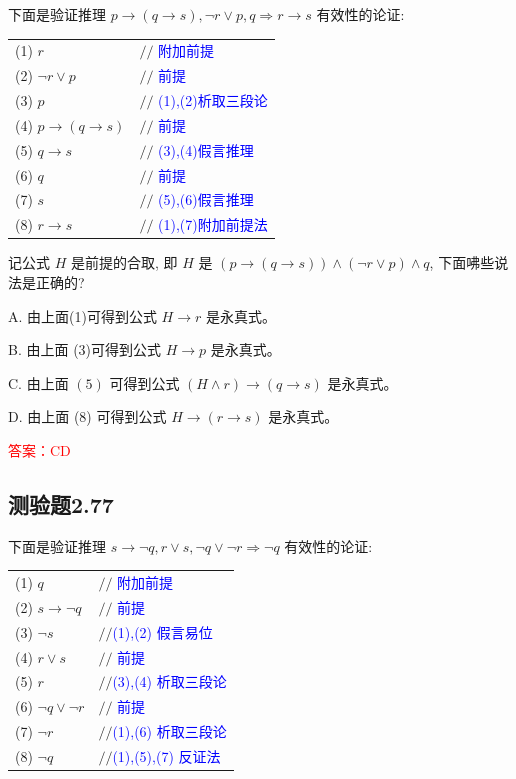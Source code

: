 \documentclass[UTF8, heading=true]{ctexart}
\begin{document}
下面是验证推理 $p \rightarrow(q \rightarrow s), \neg r \vee p, q \Longrightarrow r \rightarrow s$ 有效性的论证:

\begin{table}[H]
  \centering
  \renewcommand{\arraystretch}{1.8}
\begin{tabular}{ll} 
(1) $r$ & $/ /$ \textcolor{blue}{附加前提} \\
(2) $\neg r \vee p$ & $/ /$ \textcolor{blue}{前提} \\
(3) $p$ & $/ /$ \textcolor{blue}{(1),(2)析取三段论} \\
(4) $p \rightarrow(q \rightarrow s)$ & $/ /$ \textcolor{blue}{前提} \\
(5) $q \rightarrow s$ & $/ /$ \textcolor{blue}{(3),(4)假言推理} \\
(6) $q$ & $/ /$ \textcolor{blue}{前提} \\
(7) $s$ & $/ /$ \textcolor{blue}{(5),(6)假言推理} \\
(8) $r \rightarrow s$ & $/ /$ \textcolor{blue}{(1),(7)附加前提法}
\end{tabular}
\end{table}

记公式 $H$ 是前提的合取, 即 $H$ 是 $(p \rightarrow(q \rightarrow s)) \wedge(\neg r \vee p) \wedge q$, 下面咈些说法是正确的?

A. 由上面(1)可得到公式 $H \rightarrow r$ 是永真式。

B. 由上面 (3)可得到公式 $H \rightarrow p$ 是永真式。

C. 由上面 $(5)$ 可得到公式 $(H \wedge r) \rightarrow(q \rightarrow s)$ 是永真式。

D. 由上面 (8) 可得到公式 $H \rightarrow(r \rightarrow s)$ 是永真式。

\textcolor{red}{答案：CD}

\subsection{测验题2.77}

下面是验证推理 $s \rightarrow \neg q, r \vee s, \neg q \vee \neg r \Longrightarrow \neg q$ 有效性的论证:


\clearpage

\begin{table}[H]
  \centering
  \renewcommand{\arraystretch}{1.5}
\begin{tabular}{ll} 
(1) $q$ & $/ /$ \textcolor{blue}{附加前提} \\
(2) $s \rightarrow \neg q$ & $/ /$ \textcolor{blue}{前提} \\
(3) $\neg s$ & $/ /$\textcolor{blue}{(1),(2) 假言易位} \\
(4) $r \vee s$ & $/ /$ \textcolor{blue}{前提} \\
(5) $r$ & $/ /$\textcolor{blue}{(3),(4) 析取三段论} \\
(6) $\neg q \vee \neg r$ & $/ /$ \textcolor{blue}{前提} \\
(7) $\neg r$ & $/ /$\textcolor{blue}{(1),(6) 析取三段论} \\
(8) $\neg q$ & $/ /$\textcolor{blue}{(1),(5),(7) 反证法}
\end{tabular}
\end{table}
\end{document}

